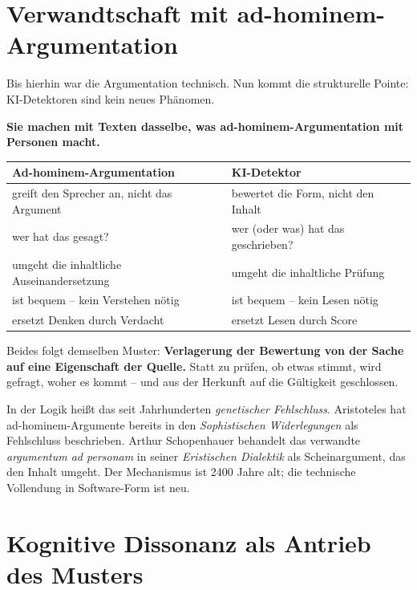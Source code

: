 \section{Verwandtschaft mit ad-hominem-Argumentation}

Bis hierhin war die Argumentation technisch. Nun kommt die
strukturelle Pointe: KI-Detektoren sind kein neues Phänomen.

\textbf{Sie machen mit Texten dasselbe, was ad-hominem-Argumentation
mit Personen macht.}

\begin{center}
\renewcommand{\arraystretch}{1.3}
{\small
\begin{tabular}{>{\raggedright\arraybackslash}p{5.0cm}>{\raggedright\arraybackslash}p{5.6cm}}
\toprule
\textbf{Ad-hominem-Argumentation} & \textbf{KI-Detektor} \\
\midrule
greift den Sprecher an, nicht das Argument & bewertet die Form, nicht den Inhalt \\[2pt]
wer hat das gesagt? & wer (oder was) hat das geschrieben? \\[2pt]
umgeht die inhaltliche Auseinandersetzung & umgeht die inhaltliche Prüfung \\[2pt]
ist bequem -- kein Verstehen nötig & ist bequem -- kein Lesen nötig \\[2pt]
ersetzt Denken durch Verdacht & ersetzt Lesen durch Score \\
\bottomrule
\end{tabular}
}
\renewcommand{\arraystretch}{1.0}
\end{center}

Beides folgt demselben Muster: \textbf{Verlagerung der Bewertung
von der Sache auf eine Eigenschaft der Quelle.} Statt zu prüfen,
ob etwas stimmt, wird gefragt, woher es kommt -- und aus der
Herkunft auf die Gültigkeit geschlossen.

In der Logik heißt das seit Jahrhunderten \emph{genetischer
Fehlschluss}. Aristoteles hat ad-hominem-Argumente bereits in den
\emph{Sophistischen Widerlegungen} als Fehlschluss beschrieben.
Arthur Schopenhauer behandelt das verwandte \emph{argumentum ad
personam} in seiner \emph{Eristischen Dialektik} als Scheinargument,
das den Inhalt umgeht. Der Mechanismus ist 2400 Jahre alt; die
technische Vollendung in Software-Form ist neu.

\section{Kognitive Dissonanz als Antrieb des Musters}

